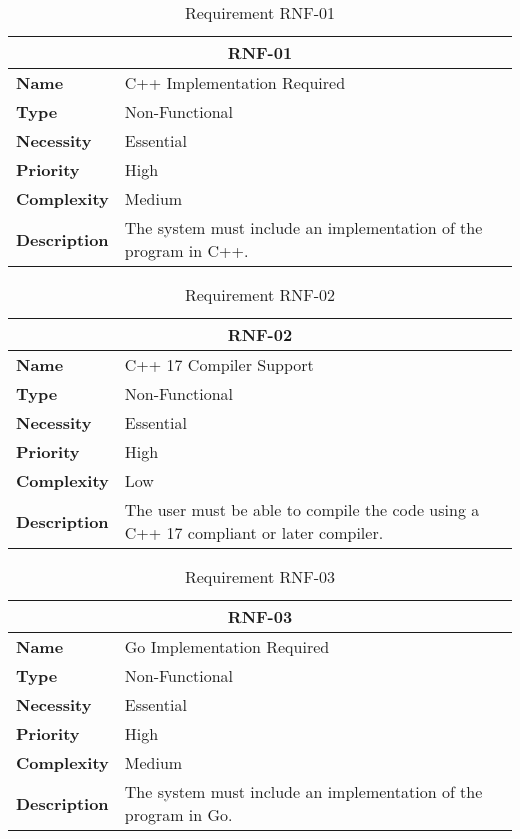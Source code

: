 \begin{table}[H]
    \centering
    \begin{tabular}{l p{10cm}}
        \toprule
        \multicolumn{2}{c}{\textbf{RNF-01}} \\
        \toprule
        \textbf{Name}         & C++ Implementation Required \\
        \textbf{Type}         & Non-Functional \\
        \textbf{Necessity}    & Essential \\
        \textbf{Priority}     & High \\
        \textbf{Complexity}   & Medium \\
        \textbf{Description}  & The system must include an implementation of the program in C++. \\
        \bottomrule
    \end{tabular}
\caption{Requirement RNF-01}\label{tab:rnf-01}
\end{table}

\begin{table}[H]
    \centering
    \begin{tabular}{l p{10cm}}
        \toprule
        \multicolumn{2}{c}{\textbf{RNF-02}} \\
        \toprule
        \textbf{Name}               & C++ 17 Compiler Support \\
        \textbf{Type}               & Non-Functional \\
        \textbf{Necessity}          & Essential \\
        \textbf{Priority}           & High \\
        \textbf{Complexity}         & Low \\
        \textbf{Description}        & The user must be able to compile the code using a C++ 17 compliant or later compiler. \\
        \bottomrule
    \end{tabular}
\caption{Requirement RNF-02}\label{tab:rnf-02}
\end{table}

\begin{table}[H]
    \centering
    \begin{tabular}{l p{10cm}}
        \toprule
        \multicolumn{2}{c}{\textbf{RNF-03}} \\
        \toprule
        \textbf{Name}         & Go Implementation Required \\
        \textbf{Type}         & Non-Functional \\
        \textbf{Necessity}    & Essential \\
        \textbf{Priority}     & High \\
        \textbf{Complexity}   & Medium \\
        \textbf{Description}  & The system must include an implementation of the program in Go. \\
        \bottomrule
    \end{tabular}
\caption{Requirement RNF-03}\label{tab:rnf-03}
\end{table}

